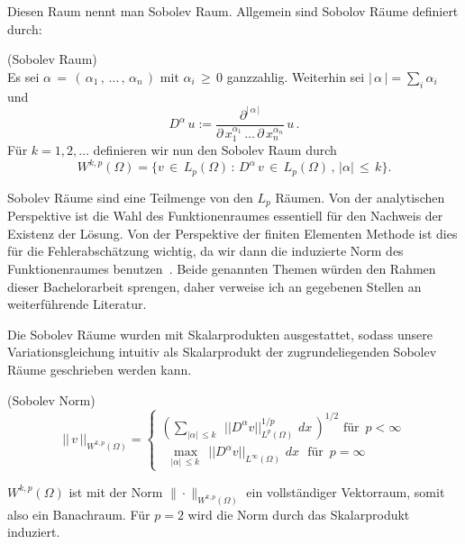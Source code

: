 Diesen Raum nennt man Sobolev Raum. Allgemein sind Sobolov Räume definiert durch:

\begin{Definition} (Sobolev Raum) \\
Es sei $\alpha \, = \, ( \, \alpha_1 \, , \, \dots  \, , \, \alpha_n \, )$ mit $\alpha_i \, \geq \, 0$ ganzzahlig. Weiterhin sei $|\, \alpha \, |= \sum_i \alpha_i$ und
\begin{equation*}
D^{\alpha} \, u := \dfrac{ \partial^{| \, \alpha \,|} } {\partial \, x_1^{\alpha_1} \, \dots \, \partial \, x_n^{\alpha_n}} \, u \, .
\end{equation*}
Für $k=1,2,\dots$ definieren wir nun den Sobolev Raum durch
\begin{equation*}
W^{k,p} (\Omega) = \{ v \, \in  \, L_p (\Omega) \, : \, D^{\alpha} \, v \, \in \, L_p (\Omega) \, , \, | \alpha | \, \leq \, k \}.
\end{equation*}
\end{Definition}

Sobolev Räume sind eine Teilmenge von den $L_{p}$ Räumen.
Von der analytischen Perspektive ist die Wahl des Funktionenraumes essentiell für den Nachweis der Existenz der Lösung. Von der Perspektive der finiten Elementen Methode ist dies für die Fehlerabschätzung wichtig, da wir dann die induzierte Norm des Funktionenraumes benutzen~\cite[36]{Johnson}. Beide genannten Themen würden den Rahmen dieser Bachelorarbeit sprengen, daher verweise ich an gegebenen Stellen an weiterführende Literatur.

Die Sobolev Räume wurden mit Skalarprodukten ausgestattet, sodass unsere Variationsgleichung intuitiv als Skalarprodukt der zugrundeliegenden Sobolev Räume geschrieben werden kann.

\begin{Definition} (Sobolev Norm) \\
\begin{equation*}
|| \, v \, ||_{W^{k,p}(\Omega)} =
\begin{cases}
( \sum\limits_{|\alpha| \, \leq k \, } \, \, || D^{\alpha}v ||_{L^p(\Omega)}^{1/p} \, \, dx \, )^{1/2} \text{ für } \, p < \infty \\
 \, \, \, \max\limits_{|\alpha| \, \leq k \, } \, \, || D^{\alpha}v ||_{L^{\infty}(\Omega)} \, \, dx \,  \, \text{ für } \, p = \infty 
\end{cases}
\end{equation*}
\end{Definition}

$W^{{k,p}}(\Omega )$ ist mit der Norm $ \|{\cdot }\|_{{W^{{k,p}}(\Omega )}}$ ein vollständiger Vektorraum, somit also ein Banachraum.
Für $p=2$ wird die Norm durch das Skalarprodukt induziert.

